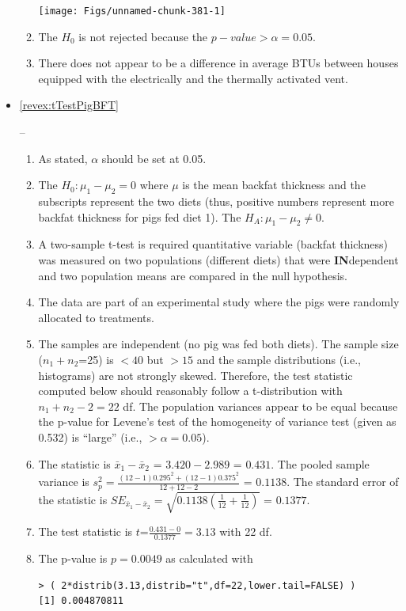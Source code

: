 \documentclass[10pt,openany]{book}\usepackage[]{graphicx}\usepackage[]{color}
\makeatletter
\newenvironment{kframe}{%
 \def\at@end@of@kframe{}%
 \ifinner\ifhmode%
  \def\at@end@of@kframe{\end{minipage}}%
  \begin{minipage}{\columnwidth}%
 \fi\fi%
 \def\FrameCommand##1{\hskip\@totalleftmargin \hskip-\fboxsep
 \colorbox{shadecolor}{##1}\hskip-\fboxsep
     \hskip-\linewidth \hskip-\@totalleftmargin \hskip\columnwidth}%
 \MakeFramed {\advance\hsize-\width
   \@totalleftmargin\z@ \linewidth\hsize
   \@setminipage}}%
 {\par\unskip\endMakeFramed%
 \at@end@of@kframe}
\newenvironment{knitrout}{}{} %
\makeatother
\begin{document}
\begin{itemize}
\begin{enumerate}
\begin{knitrout}
{\centering \texttt{[image: Figs/unnamed-chunk-381-1]} 

}



\end{knitrout}
      \item The $H_{0}$ is not rejected because the $p-value >\alpha=0.05$.
      \item There does not appear to be a difference in average BTUs between houses equipped with the electrically and the thermally activated vent.
    \end{enumerate}
  \item \hypertarget{ans:tTestPigBFT}{\ref{revex:tTestPigBFT}} --
    \begin{enumerate}
      \item As stated, $\alpha$ should be set at 0.05.
      \item The $H_{0}:\mu_{1}-\mu_{2}=0$ where $\mu$ is the mean backfat thickness and the subscripts represent the two diets (thus, positive numbers represent more backfat thickness for pigs fed diet 1).  The $H_{A}:\mu_{1}-\mu_{2}\neq0$.
      \item A two-sample t-test is required quantitative variable (backfat thickness) was measured on two populations (different diets) that were \textbf{IN}dependent and two population means are compared in the null hypothesis.
      \item The data are part of an experimental study where the pigs were randomly allocated to treatments.
      \item The samples are independent (no pig was fed both diets).  The sample size ($n_{1}+n_{2}$=25) is $<40$ but $>15$ and the sample distributions (i.e., histograms) are not strongly skewed.  Therefore, the test statistic computed below should reasonably follow a t-distribution with $n_{1}+n_{2}-2=22$ df.  The population variances appear to be equal because the p-value for Levene's test of the homogeneity of variance test (given as 0.532) is ``large'' (i.e., $>\alpha=0.05$).
      \item The statistic is $\bar{x}_{1}-\bar{x}_{2}$ = $3.420-2.989$ = $0.431$.  The pooled sample variance is $s_{p}^{2}=\frac{(12-1)0.295^{2}+(12-1)0.375^{2}}{12+12-2}$ = $0.1138$.  The standard error of the statistic is $SE_{\bar{x}_{1}-\bar{x}_{2}}=\sqrt{0.1138\left(\frac{1}{12}+\frac{1}{12} \right)}$ = $0.1377$.
      \item The test statistic is $t$=$\frac{0.431-0}{0.1377} = 3.13$ with 22 df.
      \item The p-value is $p=0.0049$ as calculated with
\begin{knitrout}
\color{fgcolor}\begin{kframe}
\begin{verbatim}
> ( 2*distrib(3.13,distrib="t",df=22,lower.tail=FALSE) )
[1] 0.004870811
\end{verbatim}
\end{kframe}


\end{knitrout}
\end{enumerate}
\end{itemize}
\end{document}
